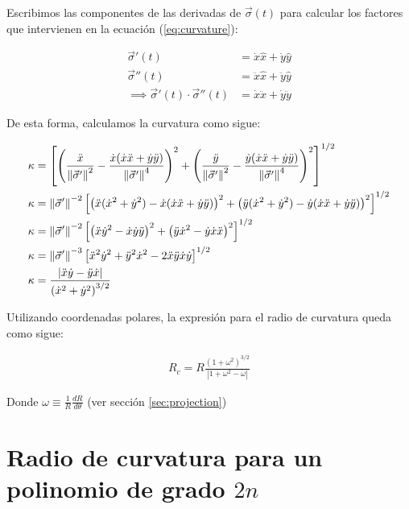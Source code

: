 Escribimos las componentes de las derivadas de $\vec{\sigma}(t)$ para calcular los factores que intervienen en la
ecuación (\ref{eq:curvature}):

\begin{align} 
  \vec{\sigma}'(t) &= \dot{x}\hat{x} + \dot{y} \hat{y} \\
  \vec{\sigma}''(t) &= \ddot{x} \hat{x} +  \ddot{y} \hat{y} \\
  \implies \vec{\sigma}'(t)\cdot\vec{\sigma}''(t) &= \dot{x}\ddot{x} + \dot{y}\ddot{y}
\end{align}

De esta forma, calculamos la curvatura como sigue:

\begin{align}
  \kappa &= \left[\left(\frac{\ddot{x}}{\left\lVert\vec{\sigma}'\right\rVert^2} - \frac{\dot{x}(\dot{x}\ddot{x} + \dot{y}\ddot{y})}{\left\lVert\vec{\sigma}'\right\rVert^4}\right)^2
  + \left(\frac{\ddot{y}}{\left\lVert\vec{\sigma}'\right\rVert^2} - \frac{\dot{y}(\dot{x}\ddot{x} + \dot{y}\ddot{y})}{\left\lVert\vec{\sigma}'\right\rVert^4} 
\right)^2\right]^{1/2} \\
 \kappa  &= \left\lVert\vec{\sigma}'\right\rVert^{-2}\left[\left(\ddot{x}(\dot{x}^2 + \dot{y}^2) - \dot{x}(\dot{x}\ddot{x} + \dot{y}\ddot{y})\right)^2
     + \left(\ddot{y}(\dot{x}^2 + \dot{y}^2) - \dot{y}(\dot{x}\ddot{x} + \dot{y}\ddot{y})\right)^2 \right]^{1/2}\\
 \kappa  &= \left\lVert\vec{\sigma}'\right\rVert^{-2}\left[\left(\ddot{x}\dot{y}^2 - \dot{x}\dot{y}\ddot{y}\right)^2 +
   \left(\ddot{y}\dot{x}^2 - \dot{y}\dot{x}\ddot{x}\right)^2 \right]^{1/2} \\
 \kappa  &=\left\lVert\vec{\sigma}'\right\rVert^{-3}\left[\ddot{x}^2\dot{y}^2 + \ddot{y}^2\dot{x}^2 - 2\ddot{x}\ddot{y}\dot{x}\dot{y}\right]^{1/2} \\
\kappa &= \frac{\left|\ddot{x}\dot{y} - \ddot{y}\dot{x}\right|}{\left(\dot{x}^2+\dot{y}^2\right)^{3/2}} 
\end{align}

Utilizando coordenadas polares, la expresión para el radio de curvatura queda como sigue:

\begin{align}
R_c = R\frac{\left(1 + \omega^2\right)^{3/2}}{\left|1 + \omega^2 - \dot{\omega}\right|}\label{eq:Rc-generic}
\end{align}

Donde $\omega \equiv \frac{1}{R}\frac{dR}{d\theta}$ (ver sección \ref{sec:projection})

\section{Radio de curvatura para un polinomio de grado $2n$}
\label{app:curvature-radius-poly}

